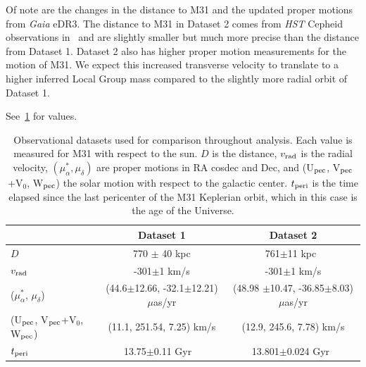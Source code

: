 \documentclass[twocolumn]{aastex631}
\begin{document}
Of note are the changes in the distance to M31 and the updated proper motions
from \textit{Gaia} eDR3. 
The distance to M31 in Dataset 2 comes from \textit{HST} Cepheid observations 
in~\cite{Li2021} and are slightly smaller but much more precise than the 
distance from Dataset 1. 
Dataset 2 also has higher proper motion measurements for the motion of M31. 
We expect this increased transverse velocity to translate to a higher inferred 
Local Group mass compared to the slightly more radial orbit of Dataset 1.



See~\ref{table:data} for values.
\begin{table}
  \centering
  \begin{tabular}{lc|c}
    \hline\hline
                    & Dataset 1                     & Dataset 2 \\\hline
  $D$               &  770 $\pm$ 40 \rm kpc\cite{}     &   761$\pm$11 \rm kpc~\citep{Li2021}        \\
  $v_{\rm rad}$     &     -301$\pm$1 km/s       &   -301$\pm$1 km/s        \\
  ($\mu_\alpha^*$,  $\mu_\delta$)    & (44.6$\pm$12.66, -32.1$\pm$12.21) $\mu$as/yr \citep{} & (48.98 $\pm$10.47, -36.85$\pm$8.03) $\mu$as/yr \citep{Salomon2021}\\
  (U$_{\rm pec}$, V$_{\rm pec}$+V$_0$, W$_{\rm pec}$) & (11.1, 251.54, 7.25) km/s& (12.9, 245.6, 7.78) km/s \citep{Drimmel2018}\\
  $t_{\rm peri}$ & 13.75$\pm$0.11 Gyr ~\citep{Jarosik2011} & 13.801$\pm$0.024 Gyr~\citep{??}\\
  \hline\hline

  \end{tabular}
  \caption{\label{table:data}Observational datasets used for comparison throughout analysis. Each value is measured for M31 with respect to the sun. $D$ is the distance, $v_{\rm rad}$ is the radial velocity, $(\mu^*_{\alpha}, \mu_{\delta})$ are proper motions in RA cosdec and Dec, and (U$_{\rm pec}$, V$_{\rm pec}$+V$_0$, W$_{\rm pec}$) the solar motion with respect to the galactic center. $t_{\rm peri}$ is the time elapsed since the last pericenter of the M31 Keplerian orbit, which in this case is the age of the Universe. }
\end{table}
\end{document}
